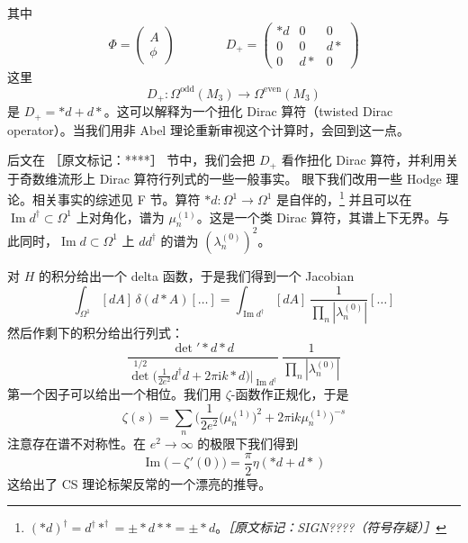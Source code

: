 其中
\begin{equation}
  \Phi=\begin{pmatrix}A\\ \phi\end{pmatrix}
  \qquad\qquad
  D_{+}=\begin{pmatrix}*d & 0 & 0\\ 0 & 0 & d*\\ 0 & d* & 0\end{pmatrix}
  \tag{2.286}
  \label{eq:2.286}
\end{equation}
这里
\begin{equation}
  D_{+}:\Omega^{\mathrm{odd}}(M_3)\to\Omega^{\mathrm{even}}(M_3)
  \tag{2.287}
  \label{eq:2.287}
\end{equation}
是 $D_{+}=*d+d*$。这可以解释为一个扭化 Dirac 算符（twisted Dirac operator）。当我们用非 Abel 理论重新审视这个计算时，会回到这一点。

后文在 ［原文标记：****］ 节中，我们会把 $D_{+}$ 看作扭化 Dirac 算符，并利用关于奇数维流形上 Dirac 算符行列式的一些一般事实。%
眼下我们改用一些 Hodge 理论。相关事实的综述见 F 节。算符 $*d:\Omega^{1}\to\Omega^{1}$ 是自伴的，\footnote{$(*d)^{\dagger}=d^{\dagger}*^{\dagger}=\pm*d**=\pm*d$。{\small\itshape ［原文标记：SIGN????（符号存疑）］}}%
并且可以在 $\operatorname{Im}d^{\dagger}\subset\Omega^{1}$ 上对角化，谱为 $\mu_{n}^{(1)}$。这是一个类 Dirac 算符，其谱上下无界。与此同时，$\operatorname{Im}d\subset\Omega^{1}$ 上 $dd^{\dagger}$ 的谱为 $(\lambda_{n}^{(0)})^{2}$。

对 $H$ 的积分给出一个 delta 函数，于是我们得到一个 Jacobian
\begin{equation}
  \int_{\Omega^{1}}[dA]\,\delta(d*A)[\ldots]
  =\int_{\operatorname{Im}d^{\dagger}}[dA]\,\frac{1}{\prod_{n}|\lambda_{n}^{(0)}|}[\ldots]
  \tag{2.288}
  \label{eq:2.288}
\end{equation}
然后作剩下的积分给出行列式：
\begin{equation}
  \frac{\det' *d*d}{\det^{1/2}\Big(\frac{1}{2e^{2}}d^{\dagger}d+2\pi\mathrm{i}k*d\Big)\Big|_{\operatorname{Im}d^{\dagger}}}\;
  \frac{1}{\prod_{n}|\lambda_{n}^{(0)}|}
  \tag{2.289}
  \label{eq:2.289}
\end{equation}
第一个因子可以给出一个相位。我们用 $\zeta$-函数作正规化，于是
\begin{equation}
  \zeta(s)=\sum_{n}\Big(\frac{1}{2e^{2}}\big(\mu_{n}^{(1)}\big)^{2}+2\pi\mathrm{i}k\mu_{n}^{(1)}\Big)^{-s}
  \tag{2.290}
  \label{eq:2.290}
\end{equation}
注意存在谱不对称性。在 $e^{2}\to\infty$ 的极限下我们得到
\begin{equation}
  \operatorname{Im}\big(-\zeta'(0)\big)=\frac{\pi}{2}\eta(*d+d*)
  \tag{2.291}
  \label{eq:2.291}
\end{equation}
这给出了 CS 理论标架反常的一个漂亮的推导。

